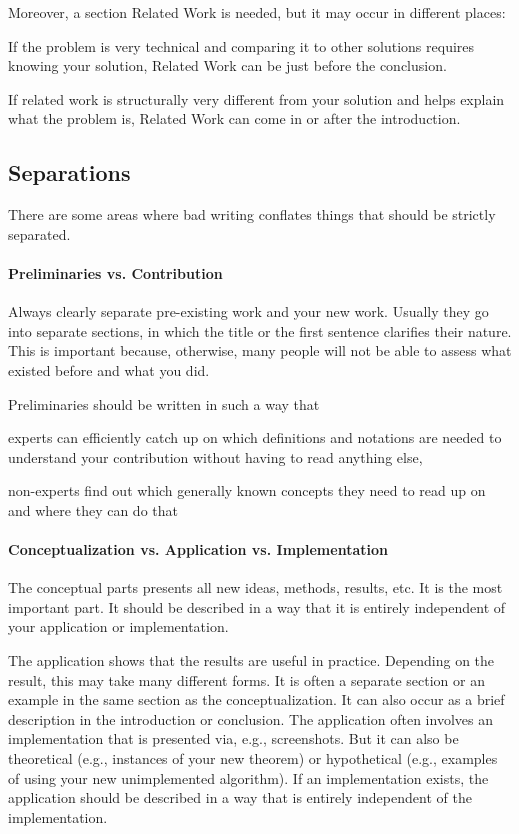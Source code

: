 \documentclass[12pt]{article}
\begin{document}
Moreover, a section Related Work is needed, but it may occur in different places:
 \begin{compactitem}
  \item If the problem is very technical and comparing it to other solutions requires knowing your solution, Related Work can be just before the conclusion.
  \item If related work is structurally very different from your solution and helps explain what the problem is, Related Work can come in or after the introduction.
 \end{compactitem}

\subsection{Separations}

There are some areas where bad writing conflates things that should be strictly separated.

\paragraph{Preliminaries vs. Contribution}
Always clearly separate pre-existing work and your new work.
Usually they go into separate sections, in which the title or the first sentence clarifies their nature.
This is important because, otherwise, many people will not be able to assess what existed before and what you did.

Preliminaries should be written in such a way that
\begin{compactitem}
 \item experts can efficiently catch up on which definitions and notations are needed to understand your contribution without having to read anything else,
 \item non-experts find out which generally known concepts they need to read up on and where they can do that
\end{compactitem}

\paragraph{Conceptualization vs. Application vs. Implementation}
The conceptual parts presents all new ideas, methods, results, etc.
It is the most important part.
It should be described in a way that it is entirely independent of your application or implementation.

The application shows that the results are useful in practice.
Depending on the result, this may take many different forms.
It is often a separate section or an example in the same section as the conceptualization.
It can also occur as a brief description in the introduction or conclusion.
The application often involves an implementation that is presented via, e.g., screenshots.
But it can also be theoretical (e.g., instances of your new theorem) or hypothetical (e.g., examples of using your new unimplemented algorithm).
If an implementation exists, the application should be described in a way that is entirely independent of the implementation.
\end{document}
